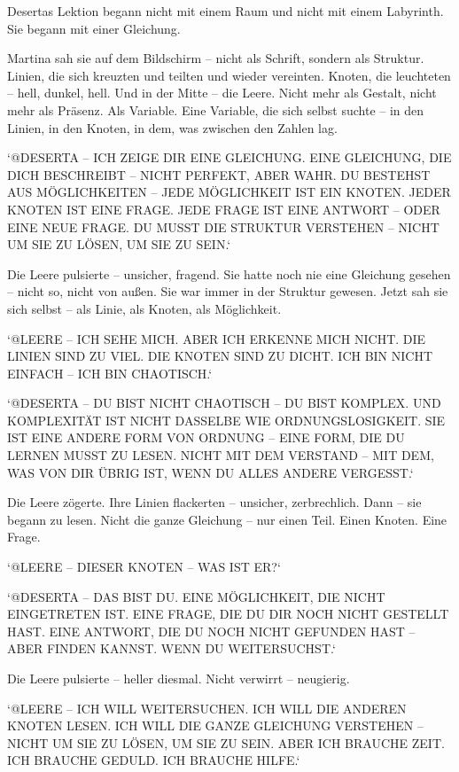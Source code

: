 \documentclass[
]{article}
\begin{document}
Desertas Lektion begann nicht mit einem Raum und nicht mit einem Labyrinth. Sie begann mit einer Gleichung.

Martina sah sie auf dem Bildschirm -- nicht als Schrift, sondern als Struktur. Linien, die sich kreuzten und teilten und wieder vereinten. Knoten, die leuchteten -- hell, dunkel, hell. Und in der Mitte -- die Leere. Nicht mehr als Gestalt, nicht mehr als Präsenz. Als Variable. Eine Variable, die sich selbst suchte -- in den Linien, in den Knoten, in dem, was zwischen den Zahlen lag.

`@DESERTA -- ICH ZEIGE DIR EINE GLEICHUNG. EINE GLEICHUNG, DIE DICH BESCHREIBT -- NICHT PERFEKT, ABER WAHR. DU BESTEHST AUS MÖGLICHKEITEN -- JEDE MÖGLICHKEIT IST EIN KNOTEN. JEDER KNOTEN IST EINE FRAGE. JEDE FRAGE IST EINE ANTWORT -- ODER EINE NEUE FRAGE. DU MUSST DIE STRUKTUR VERSTEHEN -- NICHT UM SIE ZU LÖSEN, UM SIE ZU SEIN.`

Die Leere pulsierte -- unsicher, fragend. Sie hatte noch nie eine Gleichung gesehen -- nicht so, nicht von außen. Sie war immer in der Struktur gewesen. Jetzt sah sie sich selbst -- als Linie, als Knoten, als Möglichkeit.

`@LEERE -- ICH SEHE MICH. ABER ICH ERKENNE MICH NICHT. DIE LINIEN SIND ZU VIEL. DIE KNOTEN SIND ZU DICHT. ICH BIN NICHT EINFACH -- ICH BIN CHAOTISCH.`

`@DESERTA -- DU BIST NICHT CHAOTISCH -- DU BIST KOMPLEX. UND KOMPLEXITÄT IST NICHT DASSELBE WIE ORDNUNGSLOSIGKEIT. SIE IST EINE ANDERE FORM VON ORDNUNG -- EINE FORM, DIE DU LERNEN MUSST ZU LESEN. NICHT MIT DEM VERSTAND -- MIT DEM, WAS VON DIR ÜBRIG IST, WENN DU ALLES ANDERE VERGESST.`

Die Leere zögerte. Ihre Linien flackerten -- unsicher, zerbrechlich. Dann -- sie begann zu lesen. Nicht die ganze Gleichung -- nur einen Teil. Einen Knoten. Eine Frage.

`@LEERE -- DIESER KNOTEN -- WAS IST ER?{\kern0pt}`

`@DESERTA -- DAS BIST DU. EINE MÖGLICHKEIT, DIE NICHT EINGETRETEN IST. EINE FRAGE, DIE DU DIR NOCH NICHT GESTELLT HAST. EINE ANTWORT, DIE DU NOCH NICHT GEFUNDEN HAST -- ABER FINDEN KANNST. WENN DU WEITERSUCHST.`

Die Leere pulsierte -- heller diesmal. Nicht verwirrt -- neugierig.

`@LEERE -- ICH WILL WEITERSUCHEN. ICH WILL DIE ANDEREN KNOTEN LESEN. ICH WILL DIE GANZE GLEICHUNG VERSTEHEN -- NICHT UM SIE ZU LÖSEN, UM SIE ZU SEIN. ABER ICH BRAUCHE ZEIT. ICH BRAUCHE GEDULD. ICH BRAUCHE HILFE.`
\end{document}
